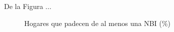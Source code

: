 \documentclass[11pt,a4paper]{article}
\begin{document}
De la Figura ...

\begin{figure}[!h]
    \centering
    \caption{Hogares que padecen de al menos una NBI (\%)}
    \label{fig:my_label}
\end{figure}
\end{document}
